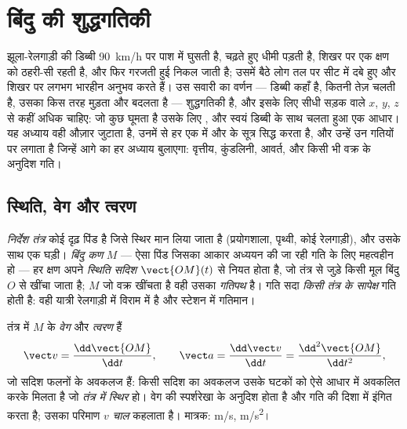 \chapter{बिंदु की शुद्धगतिकी}\label{ch:b1:point-kinematics}

झूला-रेलगाड़ी की डिब्बी \qty{90}{km/h} पर पाश में घुसती है, चढ़ते हुए धीमी
पड़ती है, शिखर पर एक क्षण को ठहरी-सी रहती है, और फिर गरजती हुई निकल जाती है;
उसमें बैठे लोग तल पर सीट में दबे हुए और शिखर पर लगभग भारहीन अनुभव करते हैं।
उस सवारी का वर्णन --- डिब्बी कहाँ है, कितनी तेज़ चलती है, उसका  किस तरह
मुड़ता और बदलता है --- शुद्धगतिकी है, और इसके लिए सीधी सड़क वाले $x$, $y$,
$z$ से कहीं अधिक चाहिए: जो कुछ घूमता है उसके लिए , और
स्वयं डिब्बी के साथ चलता हुआ एक आधार। यह अध्याय वही औज़ार जुटाता है, उनमें
से हर एक में  और  के सूत्र सिद्ध करता है, और उन्हें उन गतियों पर
लगाता है जिन्हें आगे का हर अध्याय बुलाएगा: वृत्तीय, कुंडलिनी, आवर्त, और किसी
भी वक्र के अनुदिश गति।

\section{स्थिति, वेग और त्वरण}

\begin{definition}[निर्देश तंत्र; स्थिति; गतिपथ]\label{def:b1:point-kinematics:frame}
\emph{निर्देश तंत्र} कोई दृढ़ पिंड है जिसे स्थिर मान लिया जाता है
(प्रयोगशाला, पृथ्वी, कोई रेलगाड़ी), और उसके साथ एक घड़ी। \emph{बिंदु कण}
$M$ --- ऐसा पिंड जिसका आकार अध्ययन की जा रही गति के लिए महत्वहीन हो --- हर
क्षण अपने \emph{स्थिति सदिश} $\vect{OM}(t)$ से नियत होता है, जो तंत्र से जुड़े
किसी मूल बिंदु $O$ से खींचा जाता है; $M$ जो वक्र खींचता है वही उसका
\emph{गतिपथ} है। गति सदा \emph{किसी तंत्र के सापेक्ष} गति होती है: वही यात्री
रेलगाड़ी में विराम में है और स्टेशन में गतिमान।
\end{definition}

\begin{definition}[वेग और त्वरण]\label{def:b1:point-kinematics:velocity}
तंत्र में $M$ के \emph{वेग} और \emph{त्वरण} हैं
\[
\vect v = \frac{\dd\vect{OM}}{\dd t}, \qquad
\vect a = \frac{\dd\vect v}{\dd t} = \frac{\dd^2\vect{OM}}{\dd t^2},
\]
जो सदिश फलनों के अवकलज हैं: किसी सदिश का अवकलज उसके घटकों को ऐसे आधार में
अवकलित करके मिलता है जो \emph{तंत्र में स्थिर} हो। वेग  की स्पर्शरेखा
के अनुदिश होता है और गति की दिशा में इंगित करता है; उसका परिमाण $v$
\emph{चाल} कहलाता है। मात्रक: \unit{m/s}, \unit{m/s^2}।
\end{definition}

